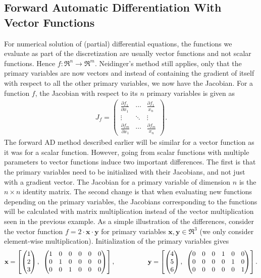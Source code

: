 \subsection{Forward Automatic Differentiation With Vector Functions}
\label{sec:FADWithVectorParameters}
For numerical solution of (partial) differential equations, the functions we evaluate as part of the discretization are usually vector functions and not scalar functions. Hence $f: \Re^n \rightarrow \Re^m$. Neidinger's method still applies, only that the primary variables are now vectors and instead of containing the gradient of itself with respect to all the other primary variables, we now have the Jacobian. For a function $f$, the Jacobian with respect to its $n$ primary variables is given as
\begin{align*}
    J_f  =
    \begin{pmatrix}
        \frac{\partial f_1}{\partial x_1} & \dotsb & \frac{\partial f_1}{x_n}\\
        \vdots & \ddots & \vdots \\
        \frac{\partial f_m}{\partial x_1} & \dotsb & \frac{\partial f_m}{x_n}
    \end{pmatrix}.
\end{align*}
The forward AD method described earlier will be similar for a vector function as it was for a scalar function. However, going from scalar functions with multiple parameters to vector functions induce two important differences. The first is that the primary variables need to be initialized with their Jacobians, and not just with a gradient vector. The Jacobian for a primary variable of dimension $n$ is the $n \times n$ identity matrix. The second change is that when evaluating new functions depending on the primary variables, the Jacobians corresponding to the functions will be calculated with matrix multiplication instead of the vector multiplication seen in the previous example. As a simple illustration of the differences, consider the vector function $f = 2\cdot \textbf{x}\cdot \textbf{y}$ for primary variables $\textbf{x},\textbf{y}\in \Re^3$ (we only consider element-wise multiplication). Initialization of the primary variables gives
\begin{equation}
    \label{def:VectorAD}
    \textbf{x} = \left[\begin{pmatrix}1\\2\\3
    \end{pmatrix},\hspace{0.5em}\begin{pmatrix}
    1&0&0&0&0&0\\
    0&1&0&0&0&0\\
    0&0&1&0&0&0\end{pmatrix} \right],
    \hspace{5em}
    \textbf{y} = \left[\begin{pmatrix}4\\5\\6
    \end{pmatrix},\hspace{0.5em}\begin{pmatrix}
    0&0&0&1&0&0\\
    0&0&0&0&1&0\\
    0&0&0&0&0&1\end{pmatrix} \right].
\end{equation}
